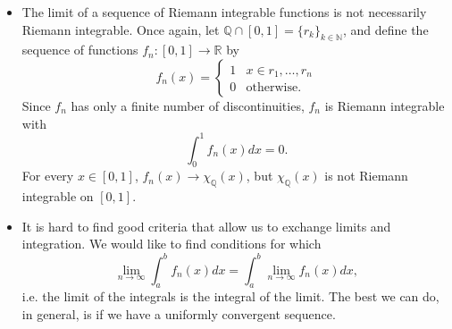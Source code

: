 \documentclass[12pt]{amsart}         %
\theoremstyle{remark}
\newcommand{\N}{\mathbb{N}}
\newcommand{\R}{\mathbb{R}}
\newcommand{\Q}{\mathbb{Q}}
\begin{document}
\begin{itemize}
    \item The limit of a sequence of Riemann integrable functions is not necessarily Riemann integrable. Once again, let $\Q \cap [0, 1] = \{ r_k \}_{k \in \N}$, and define the sequence of functions $f_n: [0, 1] \rightarrow \R$ by
    \[
    f_n(x) = \begin{cases}
    1 & x \in {r_1, \dots, r_n} \\
    0 & \text{otherwise}.
    \end{cases}
    \]
    Since $f_n$ has only a finite number of discontinuities, $f_n$ is Riemann integrable with
    \[
    \int_0^1 f_n(x) dx = 0.
    \]
    For every $x \in [0, 1]$, $f_n(x) \rightarrow \chi_\Q(x)$, but $\chi_\Q(x)$ is not Riemann integrable on $[0, 1]$.
    \item It is hard to find good criteria that allow us to exchange limits and integration. We would like to find conditions for which
    \[
    \lim_{n\rightarrow\infty}\int_a^b f_n(x) dx = \int_a^b \lim_{n\rightarrow\infty} f_n(x) dx,
    \]
    i.e. the limit of the integrals is the integral of the limit. The best we can do, in general, is if we have a uniformly convergent sequence.


\end{itemize}
\end{document}
